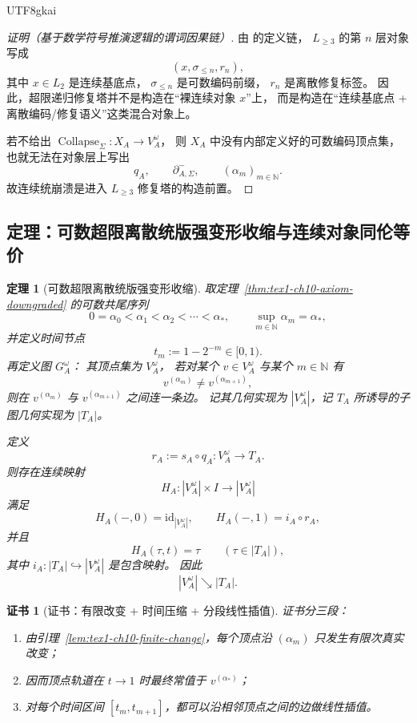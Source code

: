 \documentclass[12pt]{article}
\newtheorem{theorem}{定理}[section]
\newtheorem{Certificate}{证书}[section]
\newcommand{\NN}{\mathbb{N}}
\newcommand{\Collapse}{\operatorname{Collapse}}
\newcommand{\id}{\mathrm{id}}
\begin{document}
\begin{CJK*}{UTF8}{gkai}
\begin{proof}[证明（基于数学符号推演逻辑的谓词因果链）]
由 \cite{RepoTex41HomotopyRepairBundle} 的定义链，
\(L_{\ge 3}\) 的第 \(n\) 层对象写成
\[
  (x,\sigma_{\le n},r_n),
\]
其中 \(x\in L_2\) 是连续基底点，
\(\sigma_{\le n}\) 是可数编码前缀，
\(r_n\) 是离散修复标签。
因此，超限递归修复塔并不是构造在“裸连续对象 \(x\)”上，
而是构造在“连续基底点 + 离散编码/修复语义”这类混合对象上。

若不给出 \(\Collapse_{\Sigma}:X_A\to V_A^\omega\)，
则 \(X_A\) 中没有内部定义好的可数编码顶点集，
也就无法在对象层上写出
\[
  q_A,\qquad \partial^-_{A,\Sigma},\qquad (\alpha_m)_{m\in\NN}.
\]
故连续统崩溃是进入 \(L_{\ge 3}\) 修复塔的构造前置。
\end{proof}

\subsection{定理：可数超限离散统版强变形收缩与连续对象同伦等价}
\label{subsec:tex1-ch10-retract}

\begin{theorem}[可数超限离散统版强变形收缩]
\label{thm:tex1-ch10-retract}
取定理~\ref{thm:tex1-ch10-axiom-downgraded} 的可数共尾序列
\[
  0=\alpha_0<\alpha_1<\alpha_2<\cdots<\alpha_\ast,
  \qquad
  \sup_{m\in\NN}\alpha_m=\alpha_\ast,
\]
并定义时间节点
\[
  t_m:=1-2^{-m}\in[0,1).
\]
再定义图 \(G_A^\omega\)：
其顶点集为 \(V_A^\omega\)，
若对某个 \(v\in V_A^\omega\) 与某个 \(m\in\NN\) 有
\[
  v^{(\alpha_m)}\neq v^{(\alpha_{m+1})},
\]
则在 \(v^{(\alpha_m)}\) 与 \(v^{(\alpha_{m+1})}\) 之间连一条边。
记其几何实现为 \(|V_A^\omega|\)，记 \(T_A\) 所诱导的子图几何实现为 \(|T_A|\)。

定义
\[
  r_A:=s_A\circ q_A:V_A^\omega\to T_A.
\]
则存在连续映射
\[
  H_A:|V_A^\omega|\times I\to |V_A^\omega|
\]
满足
\[
  H_A(-,0)=\id_{|V_A^\omega|},
  \qquad
  H_A(-,1)=i_A\circ r_A,
\]
并且
\[
  H_A(\tau,t)=\tau
  \qquad
  (\tau\in |T_A|),
\]
其中 \(i_A:|T_A|\hookrightarrow |V_A^\omega|\) 是包含映射。
因此
\[
  \boxed{
    |V_A^\omega|\searrow |T_A|.
  }
\]
\end{theorem}

\begin{Certificate}[证书：有限改变 + 时间压缩 + 分段线性插值]
\label{cert:tex1-ch10-retract}
证书分三段：
\begin{enumerate}
  \item 由引理~\ref{lem:tex1-ch10-finite-change}，每个顶点沿 \((\alpha_m)\) 只发生有限次真实改变；
  \item 因而顶点轨道在 \(t\to 1\) 时最终常值于 \(v^{(\alpha_\ast)}\)；
  \item 对每个时间区间 \([t_m,t_{m+1}]\)，都可以沿相邻顶点之间的边做线性插值。
\end{enumerate}
\end{Certificate}


\end{CJK*}
\end{document}

